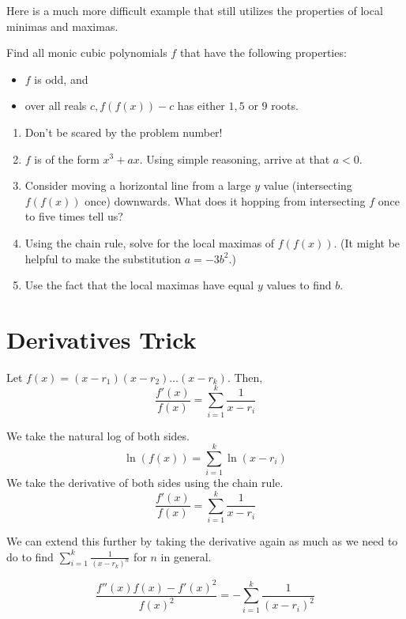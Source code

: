\documentclass[mast]{lucky}
\begin{document}
Here is a much more difficult example that still utilizes the properties of local minimas and maximas.
\begin{exam}
Find all monic cubic polynomials $f$ that have the following properties:
\begin{itemize}
\item $f$ is odd, and
\item over all reals $c, f(f(x))-c$ has either $1, 5$ or $9$ roots.
\end{itemize}
\end{exam}
\begin{walk}
\begin{enumerate}
\item Don't be scared by the problem number!
\item $f$ is of the form $x^3+ax$. Using simple reasoning, arrive at that $a<0$.
\item Consider moving a horizontal line from a large $y$ value (intersecting $f(f(x))$ once) downwards. What does it hopping from intersecting $f$ once to five times tell us?
\item Using the chain rule, solve for the local maximas of $f(f(x))$. (It might be helpful to make the substitution $a=-3b^2$.)
\item Use the fact that the local maximas have equal $y$ values to find $b$.
\end{enumerate}
\end{walk}
\section{Derivatives Trick}

\begin{theo}
Let $f(x)=(x-r_{1})(x-r_{2})\ldots(x-r_{k})$. Then,
$$\frac{f'(x)}{f(x)} = \sum_{i=1}^{k} \frac{1}{x-r_{i}}$$
\end{theo}

\begin{pro}
We take the natural log of both sides.
$$\ln (f(x)) = \sum_{i=1}^{k} \ln(x-r_{i})$$
We take the derivative of both sides using the chain rule.
$$\frac{f'(x)}{f(x)} = \sum_{i=1}^{k} \frac{1}{x-r_{i}}$$
\end{pro}

We can extend this further by taking the derivative again as much as we need to do to find $\sum_{i=1}^{k} \frac{1}{(x-r_{k})^n}$ for $n$ in general.
\begin{theo}
$$\frac{f''(x)f(x)-f'(x)^2}{f(x)^2} = -\sum_{i=1}^{k} \frac{1}{(x-r_{i})^2}$$
\end{theo}
\end{document}
